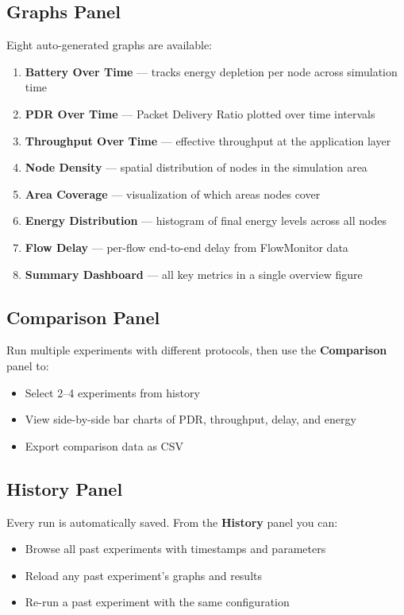 \documentclass[12pt,a4paper]{article}
\begin{document}
\subsection{Graphs Panel}

Eight auto-generated graphs are available:

\begin{enumerate}[leftmargin=1.5em]
  \item \textbf{Battery Over Time} — tracks energy depletion per node across simulation time
  \item \textbf{PDR Over Time} — Packet Delivery Ratio plotted over time intervals
  \item \textbf{Throughput Over Time} — effective throughput at the application layer
  \item \textbf{Node Density} — spatial distribution of nodes in the simulation area
  \item \textbf{Area Coverage} — visualization of which areas nodes cover
  \item \textbf{Energy Distribution} — histogram of final energy levels across all nodes
  \item \textbf{Flow Delay} — per-flow end-to-end delay from FlowMonitor data
  \item \textbf{Summary Dashboard} — all key metrics in a single overview figure
\end{enumerate}

\subsection{Comparison Panel}

Run multiple experiments with different protocols, then use the \textbf{Comparison} panel to:
\begin{itemize}[leftmargin=1.5em]
  \item Select 2--4 experiments from history
  \item View side-by-side bar charts of PDR, throughput, delay, and energy
  \item Export comparison data as CSV
\end{itemize}

\subsection{History Panel}

Every run is automatically saved. From the \textbf{History} panel you can:
\begin{itemize}[leftmargin=1.5em]
  \item Browse all past experiments with timestamps and parameters
  \item Reload any past experiment's graphs and results
  \item Re-run a past experiment with the same configuration


\end{itemize}
\end{document}
